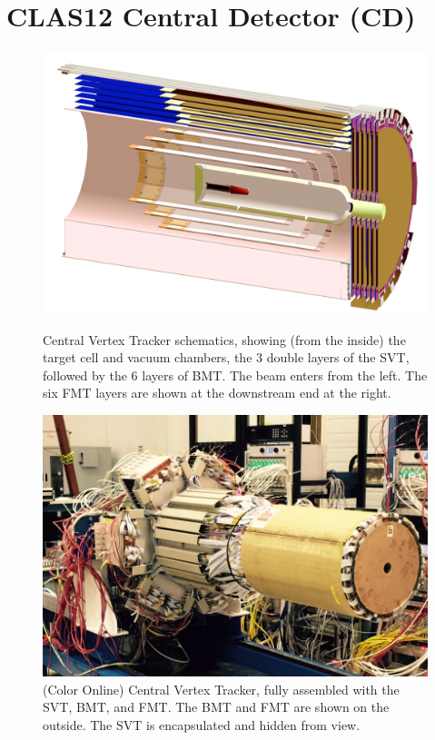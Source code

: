 \documentclass[final,3p,twocolumn]{elsarticle}
\begin{document}
\section{CLAS12 Central Detector (CD)} 
\begin{figure}[htbp!]
\centerline{\includegraphics[width=1.0\columnwidth]{CVT-schematics.png}}
\caption{ \rm Central Vertex Tracker schematics, showing (from the inside) the target cell and vacuum chambers, the 3 double layers of the SVT, followed by the 6 layers of BMT. The beam enters from the left.  The six FMT layers are shown at the downstream end at the 
right. }
\label{CVT}
\vspace{1.0cm}
\centerline{\includegraphics[width=1.0\columnwidth]{CVT.png}}
\caption{(Color Online) Central Vertex Tracker, fully assembled with the SVT, BMT, and FMT. The BMT and FMT are shown on the
outside. The SVT is encapsulated and hidden from view.}
\label{CVT}
\end{figure}
\end{document}
